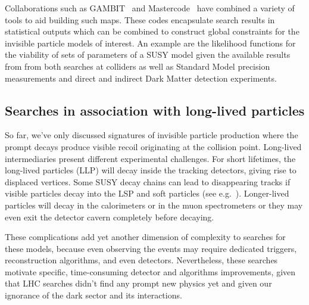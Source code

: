 Collaborations such as GAMBIT~\cite{Athron:2017ard} and Mastercode~\cite{Bagnaschi:2017tru} have combined a variety of tools to aid building such maps. These codes encapsulate search results in statistical outputs which can be combined to construct global constraints for the invisible particle models of interest. 
An example are the likelihood functions for the viability of sets of parameters of a SUSY model given the available results from from both searches at colliders as well as Standard Model precision measurements and direct and indirect Dark Matter detection experiments.

\subsection{Searches in association with long-lived particles}
\label{sec:results_LLPSearches}


So far, we've only discussed signatures of invisible particle production where the prompt decays produce visible recoil originating at the collision point. 
Long-lived intermediaries present different experimental challenges. 
For short lifetimes, the long-lived particles (LLP) will decay inside the tracking detectors, giving rise to displaced vertices. 
Some SUSY decay chains can lead to disappearing tracks if visible particles decay into the LSP and soft particles (see e.g.~\cite{Aaboud:2017mpt, CMS:2014gxa}). %
Longer-lived particles will decay in the calorimeters or in the muon spectrometers 
or they may even exit the detector cavern completely before decaying. 

These complications add yet another dimension of complexity to searches for these models, because even observing the events may require dedicated triggers, reconstruction algorithms, and even detectors\cite{Ball:2016zrp,Chou:2016lxi}. 
Nevertheless, these searches motivate specific, time-consuming detector and algorithms improvements, given that LHC searches didn't find any prompt new physics yet and given our ignorance of the dark sector and its interactions. 

